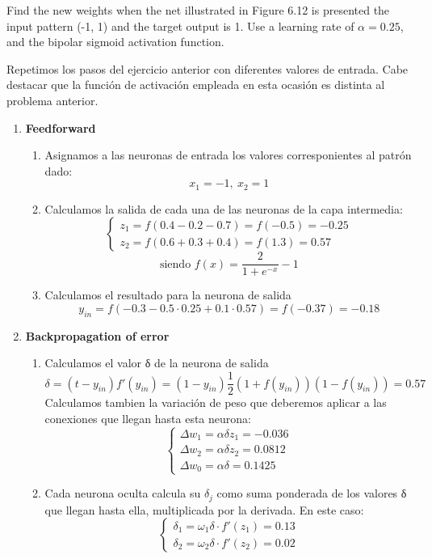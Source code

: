 \begin{problem}[2]
Find the new weights when the net illustrated in Figure 6.12 is presented the input pattern (-1, 1) and the target output is 1. Use a learning rate of $α = 0.25$, and the bipolar sigmoid activation function.

\solution

Repetimos los pasos del ejercicio anterior con diferentes valores de entrada. Cabe destacar que la función de activación empleada en esta ocasión es distinta al problema anterior.

\begin{enumerate}
\item \textbf{Feedforward}
\begin{enumerate}
\item Asignamos a las neuronas de entrada los valores corresponientes al patrón dado:
\[x_1 = -1, \ x_2 = 1\]
\item Calculamos la salida de cada una de las neuronas de la capa intermedia:
\[\left\{ \begin{array}{l}
z_1 = f(0.4 -0.2-0.7) = f(-0.5) = -0.25\\
z_2 = f(0.6+0.3+0.4) =f(1.3) = 0.57
\end{array}\right.\]
\[\text{siendo }f(x) = \frac{2}{1+e^{-x}} -1 \]

\item Calculamos el resultado para la neurona de salida
\[y_{in} = f(-0.3-0.5\cdot 0.25 + 0.1 \cdot 0.57)=f(-0.37) = -0.18\]
\end{enumerate}
\item \textbf{Backpropagation of error}
\begin{enumerate}
\item Calculamos el valor δ de la neurona de salida
\[δ = (t-y_{in})f'(y_{in}) = (1-y_{in})\frac{1}{2}(1+f(y_{in}))(1-f(y_{in})) = 0.57\]
Calculamos tambien la variación de peso que deberemos aplicar a las conexiones que llegan hasta esta neurona:
\[\left\{ \begin{array}{l}
Δw_1= αδz_1 = -0.036 \\
Δw_2= αδz_2 = 0.0812 \\
Δw_0= αδ = 0.1425
\end{array}\right.\]

\item Cada neurona oculta calcula su $δ_j$ como suma ponderada de los valores δ que llegan hasta ella, multiplicada por la derivada. En este caso:
\[\left\{ \begin{array}{l}
δ_1= ω_1 δ \cdot f'(z_1)= 0.13\\
δ_2= ω_2 δ \cdot f'(z_2)= 0.02
\end{array}\right.\]


\end{enumerate}
\end{enumerate}
\end{problem}
